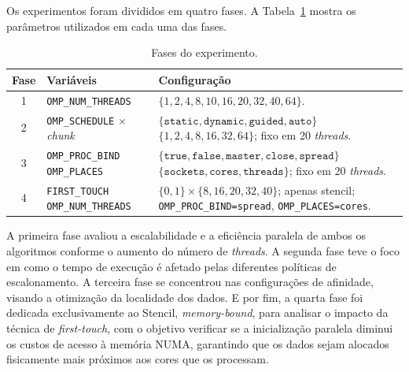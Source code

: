 \documentclass[12pt, letterpaper]{article}
\begin{document}
Os experimentos foram divididos em quatro fases. A Tabela~\ref{tab:fases} mostra os parâmetros utilizados em cada uma das fases.

\begin{table}[H]
	\centering
	\caption{Fases do experimento.}
	\label{tab:fases}
	\small

	\begin{tabular}{@{}c p{4cm} p{8cm}@{}}
		\toprule
		\textbf{Fase}                                &
		\textbf{Variáveis}                           &
		\textbf{Configuração}                          \\
		\midrule

		1                                            &
		\texttt{OMP\_NUM\_THREADS}                   &
		$\{1,2,4,8,10,16,20,32,40,64\}$.
		\\

		\addlinespace

		2                                            &
		\texttt{OMP\_SCHEDULE} $\times$ \emph{chunk} &
		$\{\texttt{static},\texttt{dynamic},\texttt{guided},\texttt{auto}\}$
		$\{1,2,4,8,16,32,64\}$;
		fixo em 20 \emph{threads}.
		\\

		\addlinespace

		3                                            &
		\texttt{OMP\_PROC\_BIND}
		\texttt{OMP\_PLACES}                         &
		$\{\texttt{true},\texttt{false},\texttt{master},
			\texttt{close},\texttt{spread}\}$
		$\{\texttt{sockets},\texttt{cores},
			\texttt{threads}\}$;
		fixo em 20 \emph{threads}.
		\\

		\addlinespace

		4                                            &
		\texttt{FIRST\_TOUCH}
		\texttt{OMP\_NUM\_THREADS}                   &
		$\{0,1\} \times \{8,16,20,32,40\}$;
		apenas stencil;
		\texttt{OMP\_PROC\_BIND=spread},
		\texttt{OMP\_PLACES=cores}.
		\\


		\bottomrule
	\end{tabular}
\end{table}

A primeira fase avaliou a escalabilidade e a eficiência paralela de ambos os algoritmos conforme o aumento do número de \emph{threads}. A segunda fase teve o foco em como o tempo de execução é afetado pelas diferentes políticas de escalonamento. A terceira fase se concentrou nas configurações de afinidade, visando a otimização da localidade dos dados. E por fim, a quarta fase foi dedicada exclusivamente ao Stencil, \emph{memory-bound}, para analisar o impacto da técnica de \emph{first-touch}, com o objetivo verificar se a inicialização paralela diminui os custos de acesso à memória NUMA, garantindo que os dados sejam alocados fisicamente mais próximos aos cores que os processam.
\end{document}
